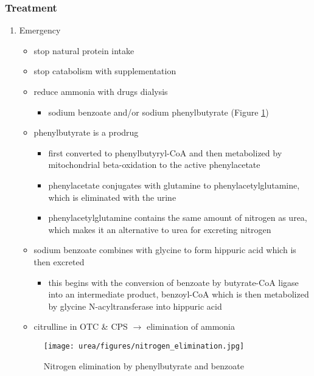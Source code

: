 \documentclass{scrartcl}
\begin{document}
\subsubsection{Treatment}
\label{sec:org4d076d3}
\begin{enumerate}
\item Emergency
\label{sec:orgbfbf054}
\begin{itemize}
\item stop natural protein intake
\item stop catabolism with supplementation
\item reduce ammonia with drugs \textpm{} dialysis
\begin{itemize}
\item sodium benzoate and/or sodium phenylbutyrate (Figure \ref{fig:org63bc81f})
\end{itemize}

\item phenylbutyrate is a prodrug
\begin{itemize}
\item first converted to phenylbutyryl-CoA and then metabolized by mitochondrial
beta-oxidation to the active phenylacetate
\item phenylacetate conjugates with glutamine to phenylacetylglutamine,
which is eliminated with the urine
\item phenylacetylglutamine contains the same amount of nitrogen as
urea, which makes it an alternative to urea for excreting nitrogen
\end{itemize}

\item sodium benzoate combines with glycine to form hippuric acid which is
then excreted
\begin{itemize}
\item this begins with the conversion of benzoate by butyrate-CoA ligase
into an intermediate product, benzoyl-CoA which is then
metabolized by glycine N-acyltransferase into hippuric acid
\end{itemize}
\item citrulline in OTC \& CPS \(\to\) elimination of ammonia
\end{itemize}

\begin{figure}[htbp]
\centering
\texttt{[image: urea/figures/nitrogen\_elimination.jpg]}
\caption{\label{fig:org63bc81f}Nitrogen elimination by phenylbutyrate and benzoate}
\end{figure}


\end{enumerate}
\end{document}
